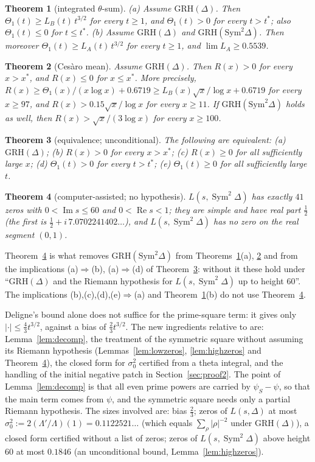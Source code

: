 \documentclass[11pt]{amsart}
\newtheorem{theorem}{Theorem}[section]
\theoremstyle{definition}
\numberwithin{equation}{section}
\newcommand{\re}{\operatorname{Re}}
\newcommand{\im}{\operatorname{Im}}
\newcommand{\Sym}{\operatorname{Sym}^2}
\newcommand{\GRHD}{\mathrm{GRH}(\Delta)}
\newcommand{\GRHS}{\mathrm{GRH}(\mathrm{Sym}^2\Delta)}
\begin{document}
\begin{theorem}[integrated $\theta$-sum]\label{thm:1}
\textup{(a)} Assume $\GRHD$. Then $\Theta_1(t)\ge L_B(t)\,t^{3/2}$ for every $t\ge1$, and $\Theta_1(t)>0$ for every $t>t^*$; also $\Theta_1(t)\le0$ for $t\le t^*$.
\textup{(b)} Assume $\GRHD$ and $\GRHS$. Then moreover $\Theta_1(t)\ge L_A(t)\,t^{3/2}$ for every $t\ge1$, and $\lim L_A\ge0.5539$.
\end{theorem}

\begin{theorem}[Ces\`aro mean]\label{thm:2}
Assume $\GRHD$. Then $R(x)>0$ for every $x>x^*$, and $R(x)\le0$ for $x\le x^*$. More precisely, $R(x)\ge \Theta_1(x)/(x\log x)+0.6719\ge L_B(x)\sqrt x/\log x+0.6719$ for every $x\ge97$, and $R(x)>0.15\sqrt x/\log x$ for every $x\ge11$. If $\GRHS$ holds as well, then $R(x)>\sqrt x/(3\log x)$ for every $x\ge100$.
\end{theorem}

\begin{theorem}[equivalence; unconditional]\label{thm:3}
The following are equivalent: \textup{(a)} $\GRHD$; \textup{(b)} $R(x)>0$ for every $x>x^*$; \textup{(c)} $R(x)\ge0$ for all sufficiently large $x$; \textup{(d)} $\Theta_1(t)>0$ for every $t>t^*$; \textup{(e)} $\Theta_1(t)\ge0$ for all sufficiently large $t$.
\end{theorem}

\begin{theorem}[computer-assisted; no hypothesis]\label{thm:4}
$L(s,\Sym\Delta)$ has exactly $41$ zeros with $0<\im s\le60$ and $0<\re s<1$; they are simple and have real part $\frac12$ (the first is $\frac12+i\,7.0702241402\ldots$), and $L(s,\Sym\Delta)$ has no zero on the real segment $(0,1)$.
\end{theorem}

Theorem~\ref{thm:4} is what removes $\GRHS$ from Theorems~\ref{thm:1}(a), \ref{thm:2} and from the implications (a)$\Rightarrow$(b), (a)$\Rightarrow$(d) of Theorem~\ref{thm:3}: without it these hold under ``$\GRHD$ and the Riemann hypothesis for $L(s,\Sym\Delta)$ up to height $60$''. The implications (b),(c),(d),(e)$\Rightarrow$(a) and Theorem~\ref{thm:1}(b) do not use Theorem~\ref{thm:4}.

Deligne's bound alone does not suffice for the prime-square term: it gives only $|\cdot|\le\frac43t^{3/2}$, against a bias of $\frac23t^{3/2}$. The new ingredients relative to \cite{WR} are: Lemma~\ref{lem:decomp}, the treatment of the symmetric square without assuming its Riemann hypothesis (Lemmas~\ref{lem:lowzeros}, \ref{lem:highzeros} and Theorem~\ref{thm:4}), the closed form for $\sigma_0^2$ certified from a theta integral, and the handling of the initial negative patch in Section~\ref{sec:proof2}. The point of Lemma~\ref{lem:decomp} is that all even prime powers are carried by $\psi_S-\psi$, so that the main term comes from $\psi$, and the symmetric square needs only a partial Riemann hypothesis. The sizes involved are: bias $\frac23$; zeros of $L(s,\Delta)$ at most $\sigma_0^2:=2(\Lambda'/\Lambda)(1)=0.1122521\ldots$ (which equals $\sum_\rho|\rho|^{-2}$ under $\GRHD$), a closed form certified without a list of zeros; zeros of $L(s,\Sym\Delta)$ above height $60$ at most $0.1846$ (an unconditional bound, Lemma~\ref{lem:highzeros}).
\end{document}
